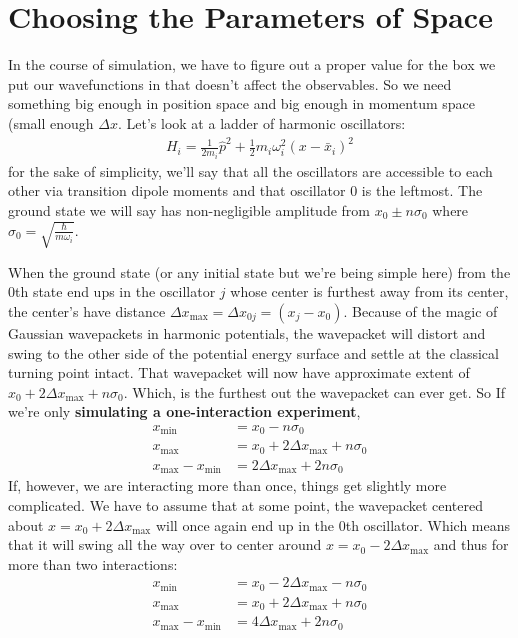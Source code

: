 \section{Choosing the Parameters of Space}
In the course of simulation, we have to figure out a proper value for the box we put our wavefunctions in that doesn't affect the observables.  So we need something big enough in position space and big enough in momentum space (small enough $\Delta x$.  Let's look at a ladder of harmonic oscillators:
\begin{align}
	H_i = \frac{1}{2m_i} \hat{p}^2 + \frac{1}{2} m_i \omega_i^2 \left( x - \bar{x}_i \right)^2
\end{align}
for the sake of simplicity, we'll say that all the oscillators are accessible to each other via transition dipole moments and that oscillator 0 is the leftmost.  The ground state we will say has non-negligible amplitude from $x_0 \pm n \sigma_0$ where $\sigma_0 = \sqrt{\frac{\hbar}{m \omega_i}}$.

When the ground state (or any initial state but we're being simple here) from the 0th state end ups in the oscillator $j$ whose center is furthest away from its center, the center's have distance $\Delta x_{\max} =  \Delta x_{0j} = ( x_j - x_0)$.  Because of the magic of Gaussian wavepackets in harmonic potentials, the wavepacket will distort and swing to the other side of the potential energy surface and settle at the classical turning point intact.  That wavepacket will now have approximate extent of $x_0 + 2 \Delta x_{\max} + n \sigma_0$.  Which, is the furthest out the wavepacket can ever get.  So If we're only \textbf{simulating a one-interaction experiment},
\begin{align}
	x_{\min} &= x_0 - n \sigma_0 \\
	x_{\max} &= x_0 + 2 \Delta x_{\max} + n \sigma_0 \\
	x_{\max} - x_{\min} &= 2 \Delta x_{\max} + 2n \sigma_0
\end{align}
If, however, we are interacting more than once, things get slightly more complicated.  We have to assume that at some point, the wavepacket centered about $x = x_0 + 2 \Delta x_{\max}$ will once again end up in the 0th oscillator.  Which means that it will swing all the way over to center around  $x = x_0 - 2 \Delta x_{\max}$ and thus for more than two interactions:
\begin{align}
	x_{\min} &= x_0 - 2 \Delta x_{\max} - n \sigma_0 \\
	x_{\max} &= x_0 + 2 \Delta x_{\max} + n \sigma_0 \\
	x_{\max} - x_{\min} &= 4 \Delta x_{\max} + 2n \sigma_0
\end{align}

